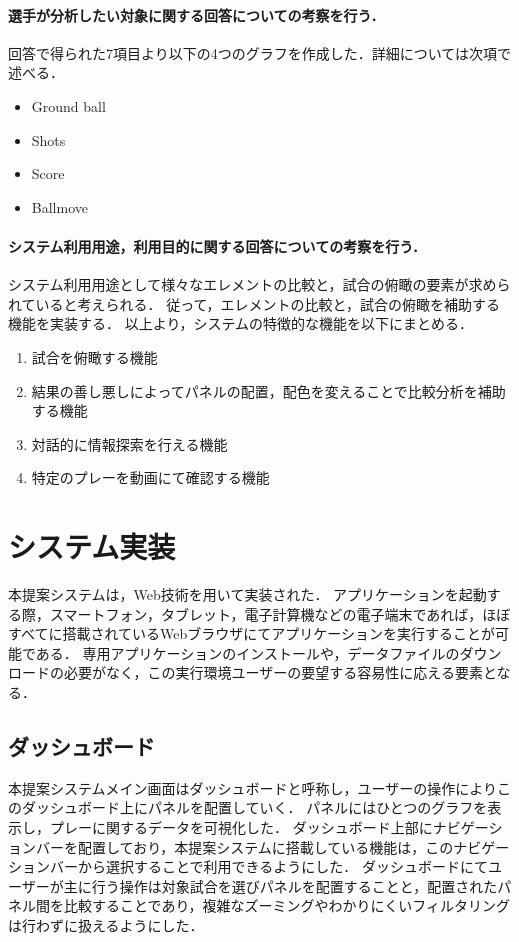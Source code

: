 \documentclass[sotsuron]{kuee}
\begin{document}
					\paragraph {選手が分析したい対象に関する回答についての考察を行う．}
						回答で得られた7項目より以下の4つのグラフを作成した．詳細については次項で述べる．
							\begin{itemize}
								\item Ground ball
								\item Shots
								\item Score
								\item Ballmove
							\end{itemize}
					\paragraph {システム利用用途，利用目的に関する回答についての考察を行う．}
						システム利用用途として様々なエレメントの比較と，試合の俯瞰の要素が求められていると考えられる．
						従って，エレメントの比較と，試合の俯瞰を補助する機能を実装する．
						以上より，システムの特徴的な機能を以下にまとめる．
						\begin{enumerate}	
							\item 試合を俯瞰する機能
							\item 結果の善し悪しによってパネルの配置，配色を変えることで比較分析を補助する機能
							\item 対話的に情報探索を行える機能
							\item 特定のプレーを動画にて確認する機能
						\end{enumerate}
	\section{システム実装}
			本提案システムは，Web技術を用いて実装された．
			アプリケーションを起動する際，スマートフォン，タブレット，電子計算機などの電子端末であれば，ほぼすべてに搭載されているWebブラウザにてアプリケーションを実行することが可能である．
			専用アプリケーションのインストールや，データファイルのダウンロードの必要がなく，この実行環境ユーザーの要望する容易性に応える要素となる．
		\subsection{ダッシュボード}
			本提案システムメイン画面はダッシュボードと呼称し，ユーザーの操作によりこのダッシュボード上にパネルを配置していく．
			パネルにはひとつのグラフを表示し，プレーに関するデータを可視化した．
			ダッシュボード上部にナビゲーションバーを配置しており，本提案システムに搭載している機能は，このナビゲーションバーから選択することで利用できるようにした．
			ダッシュボードにてユーザーが主に行う操作は対象試合を選びパネルを配置することと，配置されたパネル間を比較することであり，複雑なズーミングやわかりにくいフィルタリングは行わずに扱えるようにした．
\end{document}
